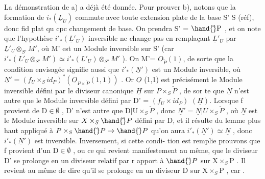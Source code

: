 La démonstration de a) a déjà été donnée. Pour prouver b), notons
que la formation de $i_*(\underline{L}_U)$ commute avec toute extension plate de la
 
base S' \quad S (réf), donc  fid plat qu cpc
 changement de base. On
prendra S' = $\hand{\check{}}\mathrm{P}$ , et on note que l'hypothèse $i'_*(\underline{L}'_U)$ inversible ne
change pas en remplaçant $\underline{L}'_U$ par $\underline{L}'_U\otimes_{S'}M'$, où M' est un Module inversible
sur S' (car $i'_*(\underline{L}'_U\otimes_{S'}M')\simeq i'_*(\underline{L}'_U)\otimes_{S'}M'$ ). On  M'= $\underline{O}_{\check{P}}(1)$, de
sorte que la condition envisagée signifie aussi que $i'_*(\underline{N}')$ est un Module
inversible, où $\underline{N}'= (f_U\times_S id_P)^*(\underline{O}_{P\times\check{P}}(1,1))$ . Or $\underline{O}$ (1,1) est précisément
le Module inversible défini par le diviseur canonique $\underline{H}$ sur $P\times_S\check{P}$ , de sor%
te que $\underline{N}$ n'est autre que le Module inversible défini par \qquad D' =
$(f_U\times id_P)$ $(\underline{H})$.  Lorsque f provient de D$\in\emptyset$ , 
D' n'est autre que D$|$U$\times_S\check{P}$ ,  donc $\underline{N}' = \underline{N}|U\times_S\check{P}$ ,
où $\underline{N}$ est le Module inversible sur $X\times_S\hand{\check{}}P$ défini par D, et il résulte
du lemme  plus haut  appliqué à $P\times_S\hand{\check{}}P\to\hand{\check{}}P$ qu'on aura
$i'_*(\underline{N}')\simeq\underline{N}$ , donc $i'_*(\underline{N}')$ est inversible. Inversement, si cette condi-%
tion est remplie prouvons que f provient d'un D$\in\emptyset$ , ou ce qui revient
manifestement au même, que le diviseur D' se prolonge en un diviseur 
 relatif par r apport  à $\hand{\check{}}P$ sur X$\times_S$P . Il  revient au même
de dire qu'il se prolonge en un diviseur  D sur X$\times_S$P , car .

